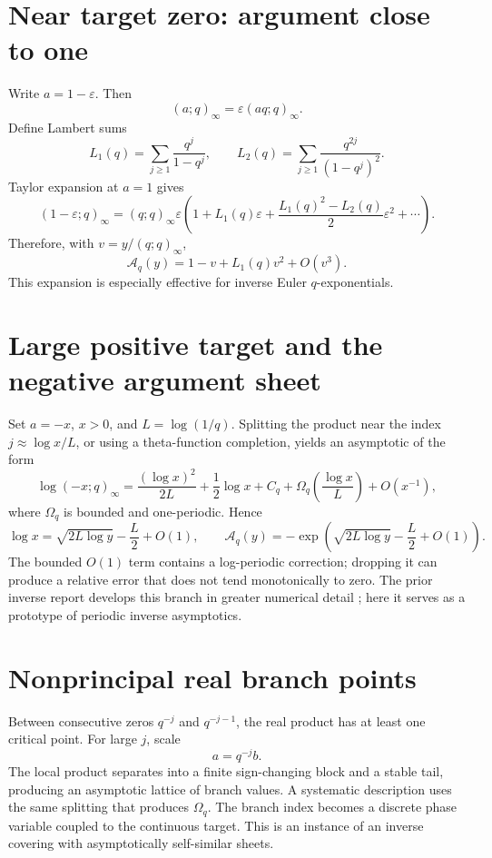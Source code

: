 \documentclass[11pt,letterpaper,oneside,openany]{book}
\theoremstyle{definition}
\theoremstyle{remark}
\newcommand{\Aq}{\mathcal A_q}
\newcommand{\eps}{\varepsilon}
\begin{document}
\section{Near target zero: argument close to one}
Write \(a=1-\eps\).  Then
\[
 (a;q)_\infty=\eps(aq;q)_\infty.
\]
Define Lambert sums
\[
 L_1(q)=\sum_{j\ge1}\frac{q^j}{1-q^j},
 \qquad
 L_2(q)=\sum_{j\ge1}\frac{q^{2j}}{(1-q^j)^2}.
\]
Taylor expansion at \(a=1\) gives
\[
 (1-\eps;q)_\infty
 =(q;q)_\infty\eps
 \left(1+L_1(q)\eps+\frac{L_1(q)^2-L_2(q)}2\eps^2+\cdots\right).
\]
Therefore, with \(v=y/(q;q)_\infty\),
\begin{equation}\label{eq:infinite-argument-near-zero-target}
 \Aq(y)=1-v+L_1(q)v^2+O(v^3).
\end{equation}
This expansion is especially effective for inverse Euler
\(q\)-exponentials.

\section{Large positive target and the negative argument sheet}
Set \(a=-x\), \(x>0\), and \(L=\log(1/q)\).  Splitting the product near the
index \(j\approx\log x/L\), or using a theta-function completion, yields an
asymptotic of the form
\begin{equation}\label{eq:large-negative-argument}
 \log(-x;q)_\infty
 =\frac{(\log x)^2}{2L}+\frac12\log x+C_q
 +\Omega_q\!\left(\frac{\log x}{L}\right)+O(x^{-1}),
\end{equation}
where \(\Omega_q\) is bounded and one-periodic.  Hence
\[
 \log x=\sqrt{2L\log y}-\frac L2+O(1),
 \qquad
 \Aq(y)=-\exp\!\left(\sqrt{2L\log y}-\frac L2+O(1)\right).
\]
The bounded \(O(1)\) term contains a log-periodic correction; dropping it can
produce a relative error that does not tend monotonically to zero.  The prior
inverse report develops this branch in greater numerical detail
\cite{ReshetnikovInverse}; here it serves as a prototype of periodic inverse
asymptotics.

\section{Nonprincipal real branch points}
Between consecutive zeros \(q^{-j}\) and \(q^{-j-1}\), the real product has at
least one critical point.  For large \(j\), scale
\[
 a=q^{-j}b.
\]
The local product separates into a finite sign-changing block and a stable
tail, producing an asymptotic lattice of branch values.  A systematic
description uses the same splitting that produces \(\Omega_q\).  The branch
index becomes a discrete phase variable coupled to the continuous target.
This is an instance of an inverse covering with asymptotically self-similar
sheets.
\end{document}
